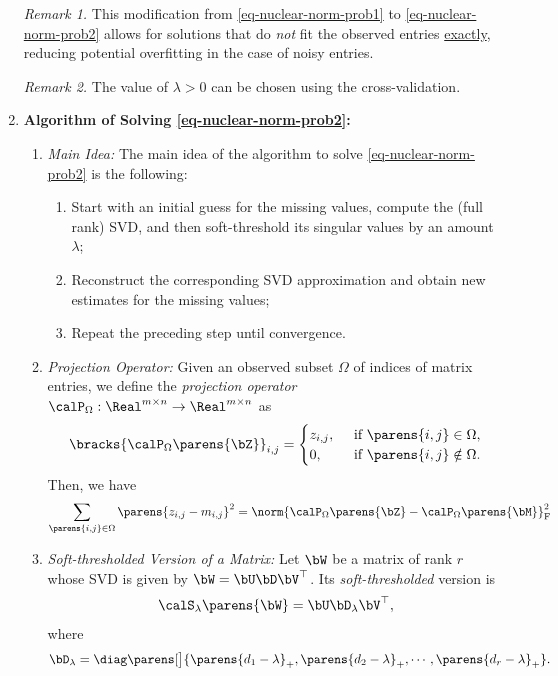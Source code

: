 \documentclass[12pt]{article}
\begin{document}
\begin{enumerate}[label=\textbf{\arabic*.}]
	\textit{Remark 1.} This modification from \eqref{eq-nuclear-norm-prob1} to \eqref{eq-nuclear-norm-prob2} allows for solutions that do \emph{not} fit the observed entries \underline{exactly}, reducing potential overfitting in the case of noisy entries. 
	
	\textit{Remark 2.} The value of $\lambda > 0$ can be chosen using the cross-validation. 
	
	\item \textbf{Algorithm of Solving \eqref{eq-nuclear-norm-prob2}:} 
	
	\begin{enumerate}
		\item \textit{Main Idea:} The main idea of the algorithm to solve \eqref{eq-nuclear-norm-prob2} is the following: 
		\begin{enumerate}
			\item Start with an initial guess for the missing values, compute the (full rank) SVD, and then soft-threshold its singular values by an amount $\lambda$; 
			\item Reconstruct the corresponding SVD approximation and obtain new estimates for the missing values; 
			\item Repeat the preceding step until convergence. 
		\end{enumerate}
		
		\item \textit{Projection Operator:} Given an observed subset $\Omega$ of indices of matrix entries, we define the \emph{projection operator} $\calP_{\Omega}: \Real^{m \times n} \to \Real^{m \times n}$ as 
		\begin{align*}
			\bracks{\calP_{\Omega} \parens{\bZ}}_{i,j} = \begin{cases}
				z_{i,j}, & \, \text{ if } \parens{i, j} \in \Omega, \\ 
				0, & \, \text{ if } \parens{i, j} \notin \Omega. 
			\end{cases}
		\end{align*}
		Then, we have 
		\begin{align*}
			\sum_{\parens{i,j} \in \Omega} \parens{z_{i,j} - m_{i,j}}^2 = \norm{\calP_{\Omega} \parens{\bZ} - \calP_{\Omega} \parens{\bM}}_{\mathrm{F}}^2
		\end{align*}
		
		\item \textit{Soft-thresholded Version of a Matrix:} Let $\bW$ be a matrix of rank $r$ whose SVD is given by $\bW = \bU \bD \bV^\top$. Its \emph{soft-thresholded} version is 
		\begin{align*}
			\calS_{\lambda} \parens{\bW} = \bU \bD_{\lambda} \bV^\top, 
		\end{align*}
		where 
		\begin{align*}
			\bD_{\lambda} = \diag \parens[\big]{\parens{d_1 - \lambda}_+, \parens{d_2 - \lambda}_+, \cdots, \parens{d_r - \lambda}_+}. 
		\end{align*}
		

\end{enumerate}
\end{enumerate}
\end{document}
